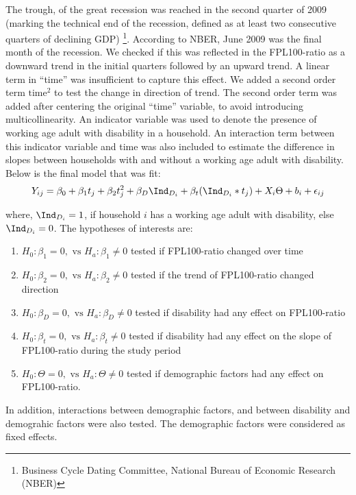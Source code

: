 \documentclass[11pt]{extarticle} %
\begin{document}
The  trough, of the great recession was reached in the second quarter of 2009 (marking the technical end of the recession, defined as at least two consecutive quarters of declining GDP) \footnote{Business Cycle Dating Committee, National Bureau of Economic Research (NBER)}. According to NBER, June 2009 was the final month of the recession. We checked if this was reflected in the FPL100-ratio as a downward trend in the initial quarters followed by an upward trend. A linear term in ``time'' was insufficient to capture this effect. We added a second order term $\text{time}^2$ to test the change in direction of trend. The second order term was added after centering the original ``time'' variable, to avoid introducing multicollinearity. An indicator variable was used to denote the presence of working age adult with disability in a household. An interaction term between this indicator variable and time was also included to estimate the difference in slopes between households with and without a working age adult with disability. Below is the final model that was fit: 
\vspace{-0.5cm}
\begin{equation}
Y_{ij} = \beta_0 + \beta_1 t_j + \beta_2 t_j^2 + \beta_D \Ind_{D_i} + \beta_t(\Ind_{D_i}*t_j) + X_i\Theta + b_i + \epsilon_{ij}
\label{eq:MixedEffects2}
\end{equation}

where, $\Ind_{D_i} = 1$, if household $i$ has a working age adult with disability, else $\Ind_{D_i} = 0$. The hypotheses of interests are:
\begin{enumerate}
\item $H_0: \beta_1 = 0, \text{  vs  } H_a: \beta_1 \ne 0$ tested if FPL100-ratio changed over time
\item $H_0: \beta_2 = 0, \text{  vs  } H_a: \beta_2 \ne 0$ tested if the trend of FPL100-ratio changed direction
\item $H_0: \beta_D = 0, \text{  vs  } H_a: \beta_D \ne 0$ tested if disability had any effect on FPL100-ratio
\item $H_0: \beta_t = 0, \text{  vs  } H_a: \beta_t \ne 0$ tested if disability had any effect on the slope of FPL100-ratio during the study period
\item $H_0: \Theta = 0, \text{  vs  } H_a: \Theta \ne 0$ tested if demographic factors had any effect on FPL100-ratio.
\end{enumerate}
In addition, interactions between demographic factors, and between disability and demograhic factors were also tested. The demographic factors were considered as fixed effects.
\end{document}
